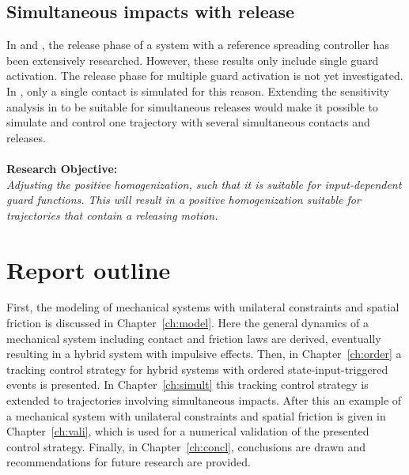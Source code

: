 \documentclass[../DC2017114Bouma.tex]{subfiles}
\begin{document}
\subsection*{Simultaneous impacts with release}
In \cite{Rijnen2016} and \cite{Rijn2016}, the release phase of a system with a reference spreading controller has been extensively researched. However, these results only include single guard activation. The release phase for multiple guard activation is not yet investigated. In \cite{Chen2018a}, only a single contact is simulated for this reason. Extending the sensitivity analysis in \cite{Chen2018a} to be suitable for simultaneous releases would make it possible to simulate and control one trajectory with several simultaneous contacts and releases.\\\\
\textbf{Research Objective:}\\
\textit{Adjusting the positive homogenization, such that it is suitable for input-dependent guard functions. This will result in a positive homogenization suitable for trajectories that contain a releasing motion.}
\section{Report outline}
First, the modeling of mechanical systems with unilateral constraints and spatial friction is discussed in Chapter~\ref{ch:model}. Here the general dynamics of a mechanical system including contact and friction laws are derived, eventually resulting in a hybrid system with impulsive effects. Then, in Chapter~\ref{ch:order} a tracking control strategy for hybrid systems with ordered state-input-triggered events is presented. In Chapter~\ref{ch:simult} this tracking control strategy is extended to trajectories involving simultaneous impacts. After this an example of a mechanical system with unilateral constraints and spatial friction is given in Chapter~\ref{ch:vali}, which is used for a numerical validation of the presented control strategy. Finally, in Chapter~\ref{ch:concl}, conclusions are drawn and recommendations for future research are provided.
\end{document}
